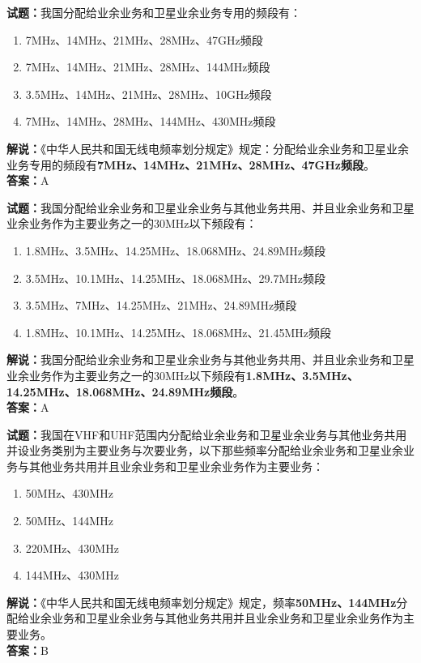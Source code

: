 \documentclass{ctexbook}
\begin{document}
\bigskip




\noindent\textbf{试题：}我国分配给业余业务和卫星业余业务专用的频段有：
\begin{enumerate}[leftmargin=3em]
\item 7\unit{\MHz}、14\unit{\MHz}、21\unit{\MHz}、28\unit{\MHz}、47\unit{\GHz}频段
\item 7\unit{\MHz}、14\unit{\MHz}、21\unit{\MHz}、28\unit{\MHz}、144\unit{\MHz}频段
\item 3.5\unit{\MHz}、14\unit{\MHz}、21\unit{\MHz}、28\unit{\MHz}、10\unit{\GHz}频段
\item 7\unit{\MHz}、14\unit{\MHz}、28\unit{\MHz}、144\unit{\MHz}、430\unit{\MHz}频段
\end{enumerate}
\noindent\textbf{解说：}《中华人民共和国无线电频率划分规定》规定：分配给业余业务和卫星业余业务专用的频段有\textbf{7\unit{\MHz}、14\unit{\MHz}、21\unit{\MHz}、28\unit{\MHz}、47\unit{\GHz}频段}。\\\noindent\textbf{答案：}A
\bigskip




\noindent\textbf{试题：}我国分配给业余业务和卫星业余业务与其他业务共用、并且业余业务和卫星业余业务作为主要业务之一的30\unit{\MHz}以下频段有：
\begin{enumerate}[leftmargin=3em]
\item 1.8\unit{\MHz}、3.5\unit{\MHz}、14.25\unit{\MHz}、18.068\unit{\MHz}、24.89\unit{\MHz}频段
\item 3.5\unit{\MHz}、10.1\unit{\MHz}、14.25\unit{\MHz}、18.068\unit{\MHz}、29.7\unit{\MHz}频段
\item 3.5\unit{\MHz}、7\unit{\MHz}、14.25\unit{\MHz}、21\unit{\MHz}、24.89\unit{\MHz}频段
\item 1.8\unit{\MHz}、10.1\unit{\MHz}、14.25\unit{\MHz}、18.068\unit{\MHz}、21.45\unit{\MHz}频段
\end{enumerate}
\noindent\textbf{解说：}我国分配给业余业务和卫星业余业务与其他业务共用、并且业余业务和卫星业余业务作为主要业务之一的30\unit{\MHz}以下频段有\textbf{1.8\unit{\MHz}、3.5\unit{\MHz}、14.25\unit{\MHz}、18.068\unit{\MHz}、24.89\unit{\MHz}频段}。\\\noindent\textbf{答案：}A
\bigskip




\noindent\textbf{试题：}我国在VHF和UHF范围内分配给业余业务和卫星业余业务与其他业务共用并设业务类别为主要业务与次要业务，以下那些频率分配给业余业务和卫星业余业务与其他业务共用并且业余业务和卫星业余业务作为主要业务： 
\begin{enumerate}[leftmargin=3em]
\item 50\unit{\MHz}、430\unit{\MHz}
\item 50\unit{\MHz}、144\unit{\MHz}
\item 220\unit{\MHz}、430\unit{\MHz}
\item 144\unit{\MHz}、430\unit{\MHz}
\end{enumerate}
\noindent\textbf{解说：}《中华人民共和国无线电频率划分规定》规定，频率\textbf{50\unit{\MHz}、144\unit{\MHz}}分配给业余业务和卫星业余业务与其他业务共用并且业余业务和卫星业余业务作为主要业务。\\\noindent\textbf{答案：}B
\end{document}

